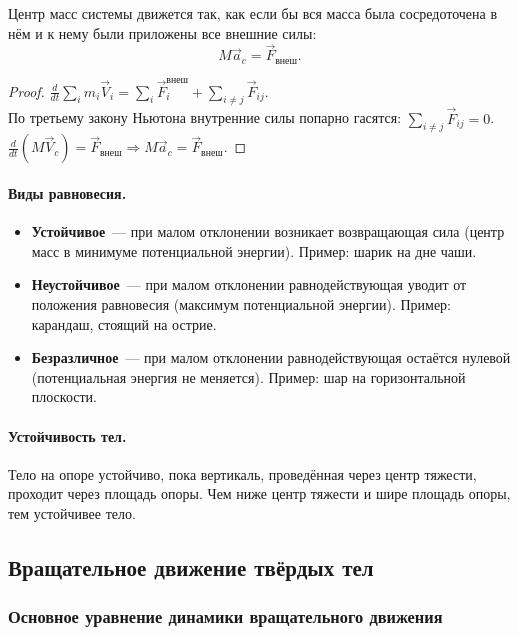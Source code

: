 \documentclass[12pt]{article}
\begin{document}
\begin{theorem}
	Центр масс системы движется так, как если бы вся масса была сосредоточена в нём и к нему были приложены все внешние силы:
	\[
		M \vec{a}_c = \vec{F}_{\text{внеш}}.
	\]
\end{theorem}
\begin{proof}
	$\frac{d}{dt}\sum_i m_i\vec{V}_i = \sum_i\vec{F}_i^{\text{внеш}} + \sum_{i\neq j}\vec{F}_{ij}$.\\
	По третьему закону Ньютона внутренние силы попарно гасятся: $\sum_{i\neq j}\vec{F}_{ij} = 0$.\\
	$\frac{d}{dt}(M\vec{V}_c) = \vec{F}_{\text{внеш}} \Rightarrow M\vec{a}_c = \vec{F}_{\text{внеш}}$.
\end{proof}

\paragraph{Виды равновесия.}
\begin{itemize}
	\item \textbf{Устойчивое}~--- при малом отклонении возникает возвращающая сила (центр масс в минимуме потенциальной энергии). Пример: шарик на дне чаши.
	\item \textbf{Неустойчивое}~--- при малом отклонении равнодействующая уводит от положения равновесия (максимум потенциальной энергии). Пример: карандаш, стоящий на острие.
	\item \textbf{Безразличное}~--- при малом отклонении равнодействующая остаётся нулевой (потенциальная энергия не меняется). Пример: шар на горизонтальной плоскости.
\end{itemize}

\paragraph{Устойчивость тел.}
Тело на опоре устойчиво, пока вертикаль, проведённая через центр тяжести, проходит через площадь опоры. Чем ниже центр тяжести и шире площадь опоры, тем устойчивее тело.

\subsection{Вращательное движение твёрдых тел}

\subsubsection{Основное уравнение динамики вращательного движения}
\end{document}
